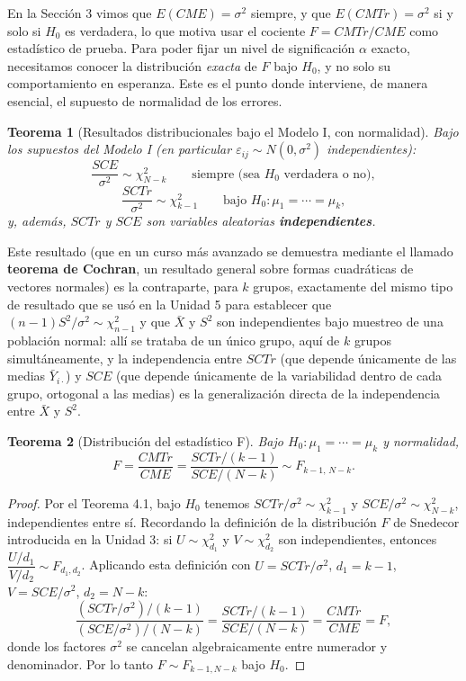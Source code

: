 \documentclass[11pt,a4paper]{article}
\theoremstyle{plain}
\newtheorem{teorema}{Teorema}[section]
\theoremstyle{definition}
\theoremstyle{remark}
\begin{document}
En la Sección 3 vimos que $E(CME)=\sigma^2$ siempre, y que $E(CMTr)=\sigma^2$ si y solo si $H_0$ es verdadera, lo que motiva usar el cociente $F=CMTr/CME$ como estadístico de prueba. Para poder fijar un nivel de significación $\alpha$ exacto, necesitamos conocer la distribución \emph{exacta} de $F$ bajo $H_0$, y no solo su comportamiento en esperanza. Este es el punto donde interviene, de manera esencial, el supuesto de normalidad de los errores.

\begin{teorema}[Resultados distribucionales bajo el Modelo I, con normalidad]
Bajo los supuestos del Modelo I (en particular $\varepsilon_{ij}\sim N(0,\sigma^2)$ independientes):
\[
\frac{SCE}{\sigma^2} \sim \chi^2_{N-k} \qquad \text{siempre (sea $H_0$ verdadera o no)},
\]
\[
\frac{SCTr}{\sigma^2} \sim \chi^2_{k-1} \qquad \text{bajo } H_0:\mu_1=\cdots=\mu_k,
\]
y, además, $SCTr$ y $SCE$ son variables aleatorias \textbf{independientes}.
\end{teorema}

Este resultado (que en un curso más avanzado se demuestra mediante el llamado \textbf{teorema de Cochran}, un resultado general sobre formas cuadráticas de vectores normales) es la contraparte, para $k$ grupos, exactamente del mismo tipo de resultado que se usó en la Unidad 5 para establecer que $(n-1)S^2/\sigma^2\sim\chi^2_{n-1}$ y que $\bar X$ y $S^2$ son independientes bajo muestreo de una población normal: allí se trataba de un único grupo, aquí de $k$ grupos simultáneamente, y la independencia entre $SCTr$ (que depende únicamente de las medias $\bar Y_{i\cdot}$) y $SCE$ (que depende únicamente de la variabilidad dentro de cada grupo, ortogonal a las medias) es la generalización directa de la independencia entre $\bar X$ y $S^2$.

\begin{teorema}[Distribución del estadístico F]
Bajo $H_0:\mu_1=\cdots=\mu_k$ y normalidad,
\[
F = \frac{CMTr}{CME} = \frac{SCTr/(k-1)}{SCE/(N-k)} \sim F_{k-1,\,N-k}.
\]
\end{teorema}

\begin{proof}
Por el Teorema 4.1, bajo $H_0$ tenemos $SCTr/\sigma^2\sim\chi^2_{k-1}$ y $SCE/\sigma^2\sim\chi^2_{N-k}$, independientes entre sí. Recordando la definición de la distribución $F$ de Snedecor introducida en la Unidad 3: si $U\sim\chi^2_{d_1}$ y $V\sim\chi^2_{d_2}$ son independientes, entonces $\dfrac{U/d_1}{V/d_2}\sim F_{d_1,d_2}$. Aplicando esta definición con $U=SCTr/\sigma^2$, $d_1=k-1$, $V=SCE/\sigma^2$, $d_2=N-k$:
\[
\frac{(SCTr/\sigma^2)/(k-1)}{(SCE/\sigma^2)/(N-k)} = \frac{SCTr/(k-1)}{SCE/(N-k)} = \frac{CMTr}{CME} = F,
\]
donde los factores $\sigma^2$ se cancelan algebraicamente entre numerador y denominador. Por lo tanto $F\sim F_{k-1,N-k}$ bajo $H_0$.
\end{proof}
\end{document}
